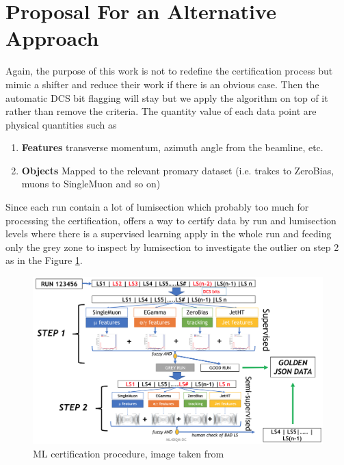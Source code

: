\section{Proposal For an Alternative Approach}
Again, the purpose of this work is not to redefine the certification process but mimic a shifter and reduce their work if there is an obvious case.
Then the automatic DCS bit flagging will stay but we apply the algorithm on top of it rather than remove the criteria.
The quantity value of each data point are physical quantities such as
\begin{enumerate}
    \item \textbf{Features} transverse momentum, azimuth angle from the beamline, etc.
    \item \textbf{Objects} Mapped to the relevant promary dataset (i.e. trakcs to ZeroBias, muons to SingleMuon and so on)
\end{enumerate}
Since each run contain a lot of lumisection which probably too much for processing the certification, \cite{fiori_ml_dc_florence} offers a way to certify data by run and lumisection levels where there is a supervised learning apply in the whole run and feeding only the grey zone to inspect by lumisection to investigate the outlier on step 2 as in the Figure \ref{fig:cartoon}.
\begin{figure}[h!]
    \centering
    \includegraphics[width=\textwidth]{images/cartoon.png}
    \caption{ML certification procedure, image taken from \cite{fiori_ml_dc_florence}}
    \label{fig:cartoon}
\end{figure}